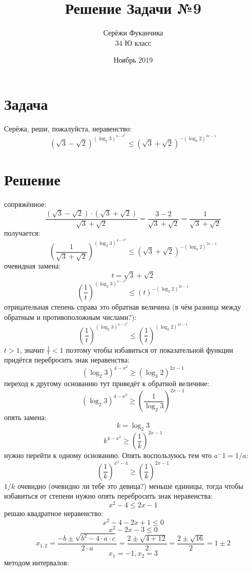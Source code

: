 \documentclass{article}
\title{Решение Задачи №9}
\author{Серёжи Фуканчика\\34 Ю класс}
\date{Ноябрь 2019}
\begin{document}
\maketitle

\section{Задача}
Серёжа, реши, пожалуйста, неравенство:
$$\left(\sqrt{3}-\sqrt{2}\right)^{(\log_{2}{3})^{4-x^2}} \leq \left(\sqrt{3}+\sqrt{2}\right)^{-(\log_{3}{2})^{2x-1}}$$

\section{Решение}
сопряжённое:
$$\frac{(\sqrt{3}-\sqrt{2})\cdot(\sqrt{3}+\sqrt{2})}{\sqrt{3}+\sqrt{2}}=\frac{3-2}{\sqrt{3}+\sqrt{2}}=\frac{1}{\sqrt{3}+\sqrt{2}}$$
получается:
$$\left(\frac{1}{\sqrt{3}+\sqrt{2}}\right)^{(\log_{2}{3})^{4-x^2}} \leq \left(\sqrt{3}+\sqrt{2}\right)^{-(\log_{3}{2})^{2x-1}}$$
очевидная замена:
\[
t=\sqrt{3}+\sqrt{2}
\]
\[
\left(\frac{1}{t}\right)^{(\log_{2}{3})^{4-x^2}} \leq \left(t\right)^{-(\log_{3}{2})^{2x-1}}
\]
отрицательная степень справа это обратная величина (в чём разница между обратным и противоположным числами?):
\[
\left(\frac{1}{t}\right)^{(\log_{2}{3})^{4-x^2}} \leq \left(\frac{1}{t}\right)^{(\log_{3}{2})^{2x-1}}
\]
$t>1$, значит $\frac{1}{t}<1$ поэтому чтобы избавиться от показательной функции придётся перебросить знак неравенства:
\[
  {(\log_{2}{3})^{4-x^2}} \geq {(\log_{3}{2})^{2x-1}}
\]
переход к другому основанию тут приведёт к обратной величине:
\[
  {(\log_{2}{3})^{4-x^2}} \geq {(\frac{1}{\log_{2}{3}})^{2x-1}}
\]
опять замена:
\[
k=\log_{2}{3}
\]
\[
  {k^{4-x^2}} \geq {\left(\frac{1}{k}\right)^{2x-1}}
\]
нужно перейти к одному основанию. Опять воспользуюсь тем что $a^-1=1/a$:
\[
  {\left(\frac{1}{k}\right)^{x^2-4}} \geq {\left(\frac{1}{k}\right)^{2x-1}}
\]
$1/k$ очевидно (очевидно ли тебе это девица?) меньше единицы, тогда чтобы избавиться от степени нужно опять перебросить знак неравенства:
\[
x^2-4 \leq {2x-1}
\]
решаю квадратное неравенство:
\[
x^2-4 -2x+1 \leq 0
\]
\[
x^2-2x-3 \leq 0
\]
\[
x_{1,2}=\frac{-b\pm{}\sqrt{b^2-4\cdot{}a\cdot{}c}}{2\cdot{}a}=\frac{2\pm{}\sqrt{4+12}}{2}=\frac{2\pm{}\sqrt{16}}{2}=1\pm{}2
\]
\[
x_1=-1,x_2=3
\]
методом интервалов:

\begin{center}
\end{center}
\end{document}

